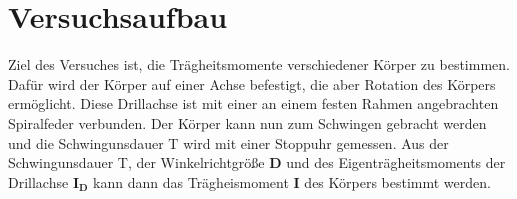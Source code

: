 \section{Versuchsaufbau}
\label{sec:Versuchsaufbau}
Ziel des Versuches ist, die Trägheitsmomente verschiedener Körper zu bestimmen. 
Dafür wird der Körper auf einer Achse befestigt, die aber Rotation des Körpers ermöglicht. %
Diese Drillachse ist mit einer an einem festen Rahmen angebrachten Spiralfeder verbunden.
Der Körper kann nun zum Schwingen gebracht werden und die Schwingunsdauer T wird mit einer Stoppuhr gemessen.
Aus der Schwingunsdauer T, der Winkelrichtgröße $\symbf{D}$ %
 und des Eigenträgheitsmoments der Drillachse $\symbf{I_D}$  
kann dann das Trägheismoment $\symbf{I}$ des Körpers bestimmt werden. %
